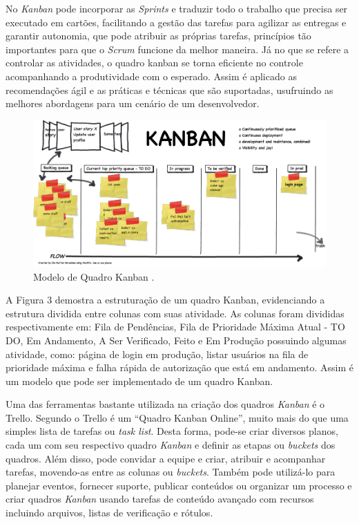     No \textit{Kanban} pode incorporar as \textit{Sprints} e traduzir todo o trabalho que precisa ser executado em cartões, facilitando a gestão das tarefas para agilizar as entregas e garantir autonomia, que pode atribuir as próprias tarefas, princípios tão importantes para que o \textit{Scrum} funcione da melhor maneira. Já no que se refere a controlar as atividades, o quadro kanban se torna eficiente no controle acompanhando a produtividade com o esperado. Assim é aplicado as recomendações ágil e as práticas e técnicas que são suportadas, usufruindo as melhores abordagens para um cenário de um desenvolvedor.
    
    \begin{figure}[h]
    \centering
    \includegraphics[width=1.0\textwidth]{./img/QuadroKanban.png}
    \caption{Modelo de Quadro Kanban .}
    \label{fig:CasoUso}
    \end{figure}

    A Figura 3 demostra a estruturação de um quadro Kanban, evidenciando a estrutura dividida entre colunas com suas atividade. As colunas foram divididas respectivamente em: Fila de Pendências, Fila de Prioridade Máxima Atual - TO DO, Em Andamento, A Ser Verificado, Feito e Em Produção possuindo algumas atividade, como: página de login em produção, listar usuários na fila de prioridade máxima e falha rápida de autorização que está em andamento. Assim é um modelo que pode ser implementado de um quadro Kanban.

    Uma das ferramentas bastante utilizada na criação dos quadros \textit{Kanban} é o Trello. Segundo  o Trello é um “Quadro Kanban Online”, muito mais do que uma simples lista de tarefas ou \textit{task list}. Desta forma, pode-se criar diversos planos, cada um com seu respectivo quadro \textit{Kanban} e definir as etapas ou \textit{buckets} dos quadros. Além disso, pode convidar a equipe e criar, atribuir e acompanhar tarefas, movendo-as entre as colunas ou \textit{buckets}. Também pode utilizá-lo para planejar eventos, fornecer suporte, publicar conteúdos ou organizar um processo e criar quadros \textit{Kanban} usando tarefas de conteúdo avançado com recursos incluindo arquivos, listas de verificação e rótulos.

